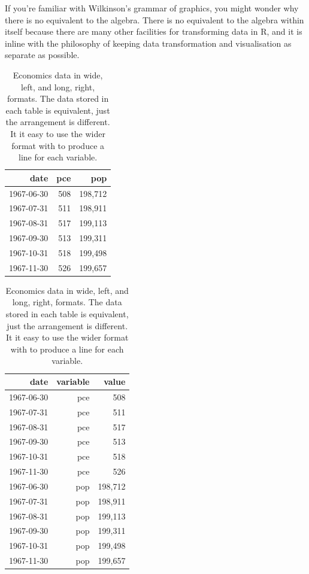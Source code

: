 If you're familiar with Wilkinson's grammar of graphics, you might wonder why there is no equivalent to the algebra.  There is no equivalent to the algebra within \ggplot itself because there are many other facilities for transforming data in R, and it is inline with the \ggplot philosophy of keeping data transformation and visualisation as separate as possible.


\begin{table}[ht]
  \centering
  \begin{minipage}[t]{0.4\linewidth}
  \begin{tabular}{rrr}
    \toprule
    date & pce & pop \\
    \midrule
    1967-06-30 & 508 & 198,712 \\
    1967-07-31 & 511 & 198,911 \\
    1967-08-31 & 517 & 199,113 \\
    1967-09-30 & 513 & 199,311 \\
    1967-10-31 & 518 & 199,498 \\
    1967-11-30 & 526 & 199,657 \\
    \bottomrule
  \end{tabular}
  \end{minipage}
  \hspace{0.5cm}
  \begin{minipage}[t]{0.4\linewidth}
  \begin{tabular}{rrr}
    \toprule
    date & variable & value \\
    \midrule
    1967-06-30 & pce &     508 \\
    1967-07-31 & pce &     511 \\
    1967-08-31 & pce &     517 \\
    1967-09-30 & pce &     513 \\
    1967-10-31 & pce &     518 \\
    1967-11-30 & pce &     526 \\
    1967-06-30 & pop & 198,712 \\
    1967-07-31 & pop & 198,911 \\
    1967-08-31 & pop & 199,113 \\
    1967-09-30 & pop & 199,311 \\
    1967-10-31 & pop & 199,498 \\
    1967-11-30 & pop & 199,657 \\
    \midrule
  \end{tabular}
  \end{minipage}

  \caption{Economics data in wide, left, and long, right, formats.  The data stored in each table is equivalent, just the arrangement is different.  It it easy to use the wider format with \ggplot to produce a line for each variable.}
  \label{tbl:melt}
\end{table}

